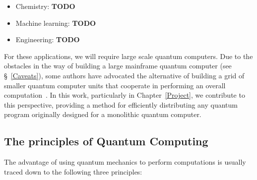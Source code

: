 \begin{itemize}
  \item Chemistry: \textbf{TODO}
  \item Machine learning: \textbf{TODO}
  \item Engineering: \textbf{TODO}
\end{itemize}

For these applications, we will require large scale quantum computers. Due to the obstacles in the way of building a large mainframe quantum computer (see \S~\ref{Caveats}), some authors have advocated the alternative of building a grid of smaller quantum computer units that cooperate in performing an overall computation~\cite{DistributedQCHW}. In this work, particularly in Chapter~\ref{Project}, we contribute to this perspective, providing a method for efficiently distributing any quantum program originally designed for a monolithic quantum computer.

\subsection{The principles of Quantum Computing}

The advantage of using quantum mechanics to perform computations is usually traced down to the following three principles:

